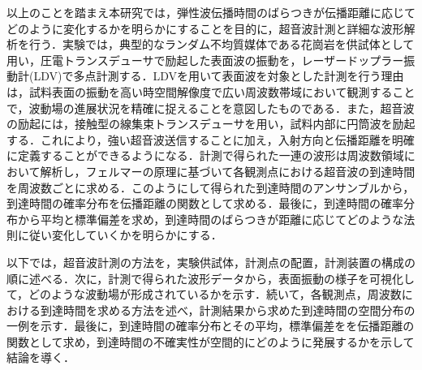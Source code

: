 以上のことを踏まえ本研究では，弾性波伝播時間のばらつきが伝播距離に応じてどのように変化するかを明らかにすることを目的に，超音波計測と詳細な波形解析を行う．実験では，典型的なランダム不均質媒体である花崗岩を供試体として用い，圧電トランスデューサで励起した表面波の振動を，レーザードップラー振動計(LDV)で多点計測する．LDVを用いて表面波を対象とした計測を行う理由は，試料表面の振動を高い時空間解像度で広い周波数帯域において観測することで，波動場の進展状況を精確に捉えることを意図したものである．また，超音波の励起には，接触型の線集束トランスデューサを用い，試料内部に円筒波を励起する．これにより，強い超音波送信することに加え，入射方向と伝播距離を明確に定義することができるようになる．計測で得られた一連の波形は周波数領域において解析し，フェルマーの原理に基づいて各観測点における超音波の到達時間を周波数ごとに求める．このようにして得られた到達時間のアンサンブルから，到達時間の確率分布を伝播距離の関数として求める．最後に，到達時間の確率分布から平均と標準偏差を求め，到達時間のばらつきが距離に応じてどのような法則に従い変化していくかを明らかにする．

以下では，超音波計測の方法を，実験供試体，計測点の配置，計測装置の構成の順に述べる．次に，計測で得られた波形データから，表面振動の様子を可視化して，どのような波動場が形成されているかを示す．続いて，各観測点，周波数における到達時間を求める方法を述べ，計測結果から求めた到達時間の空間分布の一例を示す．最後に，到達時間の確率分布とその平均，標準偏差をを伝播距離の関数として求め，到達時間の不確実性が空間的にどのように発展するかを示して結論を導く．
